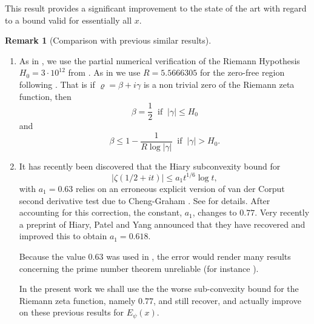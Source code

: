 \documentclass[10pt]{amsart}
\theoremstyle{definition}
\newtheorem{Rem}[prop]{Remark}
\numberwithin{equation}{section}
\begin{document}
This result provides a significant improvement to the state of the art with regard to a bound valid for essentially all $x$.
 
 \begin{Rem}[Comparison with previous similar results]\label{compprev}\ \noindent
\begin{enumerate}
\item
As in \cite{PlaTru21ET}, we use the partial numerical verification of the Riemann Hypothesis $H_0 = 3\cdot 10^{12}$ from \cite{PlaTru21RH}.
As in \cite{CulJoh21} we use $R= 5.5666305$ for the zero-free region following \cite[Theorem 1 and Section 6.1]{TrudMos15}. 
That is if $\varrho=\beta+i\gamma$ is a non trivial zero of the Riemann zeta function, then 
\begin{equation}\label{verifRH}
\beta =\frac12 \ \text{ if }\ |\gamma|\le H_0
\end{equation}
and 
\begin{equation}\label{zfr}
\beta \le 1- \frac1{R\log |\gamma|}\ \text{ if }\ |\gamma| >H_0.
\end{equation}
\item \label{subconv}
It has recently been discovered that the Hiary \cite{Hia15} subconvexity bound for 
\[|\zeta(1/2+it)|\le a_1 t^{1/6} \log t,\] with $a_1=0.63$ relies on an erroneous explicit version of van der Corput second derivative test due to Cheng-Graham \cite{ChGr04}.  
See \cite[Footnote 3]{Pat21+} for details. 
After accounting for this correction, the constant, $a_1$, changes to $0.77$.
Very recently a preprint of Hiary, Patel and Yang \cite{HPY22}  announced that they have recovered and improved this to obtain $a_1= 0.618$.

Because the value $0.63$ was used in  \cite[Theorem 1.1]{KLN18}, the error would render many results concerning the prime number theorem unreliable (for instance \cite{Tru14b, PlaTru15,PlaTru21ET,CulJoh21}).

In the present work we shall use the the worse sub-convexity bound for the Riemann zeta function, namely $0.77$, and still recover, and actually improve on these previous results for $E_{\psi}(x)$. 


\end{enumerate}
\end{Rem}
\end{document}
